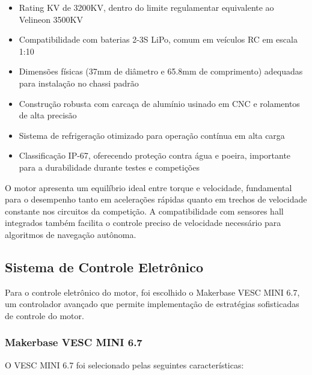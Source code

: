 \begin{itemize}
      \item Rating KV de 3200KV, dentro do limite regulamentar equivalente ao Velineon
            3500KV
      \item Compatibilidade com baterias 2-3S LiPo, comum em veículos RC em escala 1:10
      \item Dimensões físicas (37mm de diâmetro e 65.8mm de comprimento) adequadas para
            instalação no chassi padrão
      \item Construção robusta com carcaça de alumínio usinado em CNC e rolamentos de alta
            precisão
      \item Sistema de refrigeração otimizado para operação contínua em alta carga
      \item Classificação IP-67, oferecendo proteção contra água e poeira, importante para
            a durabilidade durante testes e competições
\end{itemize}

O motor apresenta um equilíbrio ideal entre torque e velocidade, fundamental
para o desempenho tanto em acelerações rápidas quanto em trechos de velocidade
constante nos circuitos da competição. A compatibilidade com sensores hall
integrados também facilita o controle preciso de velocidade necessário para
algoritmos de navegação autônoma.

\subsection{Sistema de Controle Eletrônico}

Para o controle eletrônico do motor, foi escolhido o Makerbase VESC MINI 6.7,
um controlador avançado que permite implementação de estratégias sofisticadas
de controle do motor.

\subsubsection{Makerbase VESC MINI 6.7}

O VESC MINI 6.7 foi selecionado pelas seguintes características:

